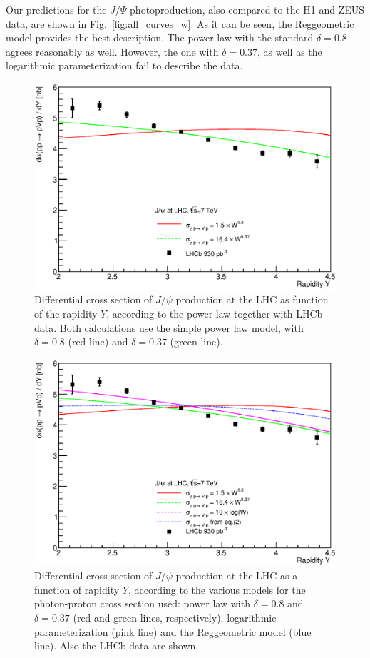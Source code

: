\documentclass[12pt]{article}
\begin{document}
Our predictions for the $J/\Psi$ photoproduction, also compared to the H1 and ZEUS data, are shown in Fig.~\ref{fig:all_curves_w}.
As it can be seen, the Reggeometric model provides the best description.
The power law with the standard $\delta=0.8$ agrees reasonably as well.
However, the one with $\delta=0.37$, as well as the logarithmic parameterization fail to describe the data.

\begin{figure}[!h]
\centering
 \includegraphics[width=.8\textwidth]{figures/dSigma_dy_comparison2.eps}
 \caption{Differential cross section of $J/\psi$ production at the LHC as function of the rapidity $Y$, according to the power law  together with LHCb data.
          Both calculations use the simple power law model, with $\delta=0.8$ (red line) and $\delta=0.37$ (green line).}
 \label{fig:delta_fit}
\end{figure}

\begin{figure}[p]
\centering
 \includegraphics[width=.8\textwidth]{figures/dSigma_dy_comparison3.eps}
 \caption{Differential cross section of $J/\psi$ production at the LHC as a function of rapidity $Y$, according to the various models for the photon-proton cross section used: power law with $\delta=0.8$ and $\delta=0.37$ (red and green lines, respectively), logarithmic parameterization (pink line) and the Reggeometric model (blue line). Also the LHCb data are shown.}
  \label{fig:all_curves}
\end{figure}
\end{document}
